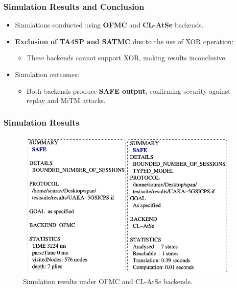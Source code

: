 \documentclass[9pt,handout]{beamer}
\begin{document}
\begin{frame}
    \frametitle{Simulation Results and Conclusion}
    \begin{itemize}
        \item Simulations conducted using \textbf{OFMC} and \textbf{CL-AtSe} backends.
        \item \textbf{Exclusion of TA4SP and SATMC} due to the use of XOR operation:
            \begin{itemize}
                \item These backends cannot support XOR, making results inconclusive.
            \end{itemize}
        \item Simulation outcomes:
            \begin{itemize}
                \item Both backends produce \textbf{SAFE output}, confirming security against replay and MiTM attacks.
            \end{itemize}
    \end{itemize}
\end{frame}

\begin{frame}
    \frametitle{Simulation Results}
    \begin{figure}
        \centering
        \includegraphics[width=0.8\linewidth]{fig6.png} %
        \caption{Simulation results under OFMC and CL-AtSe backends.}
        \label{fig:simulation_results}
    \end{figure}
\end{frame}
\end{document}
